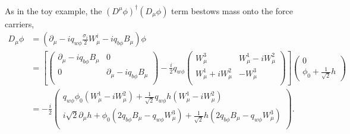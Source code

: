 \documentclass[12pt]{article}
\begin{document}
As in the toy example, the $(D^\mu\phi)^\dagger(D_\mu\phi)$ term bestows mass onto the force carriers,
\begin{equation}
\begin{split}
D_\mu\phi &= (\partial_\mu - iq_{w\phi}\frac{\sigma_i}{2}W^i_\mu - iq_{b\phi}B_\mu)\phi \\
          &= \left[ 
\begin{pmatrix}
\partial_\mu - iq_{b\phi}B_\mu & 0 \\
0 & \partial_\mu - iq_{b\phi}B_\mu \\
\end{pmatrix} 
 - \frac{i}{2}q_{w\phi}
\begin{pmatrix}
W^3_\mu & W^1_\mu - iW^2_\mu \\
W^1_\mu + iW^2_\mu & -W^3_\mu \\
\end{pmatrix} \right] \begin{pmatrix} 0 \\ \phi_0 + \frac{1}{\sqrt{2}}h \end{pmatrix} \\
         &= -\frac{i}{2}
\begin{pmatrix}
q_{w\phi}\phi_0(W^1_\mu - iW^2_\mu) + \frac{1}{\sqrt{2}}q_{w\phi}h(W^1_\mu - iW^2_\mu)\\
i\sqrt{2}\partial_\mu h + \phi_0(2q_{b\phi}B_\mu - q_{w\phi}W^3_\mu) + \frac{1}{\sqrt{2}}h(2q_{b\phi}B_\mu - q_{w\phi}W^3_\mu)\\
\end{pmatrix}.
\end{split}
\end{equation}
\end{document}
